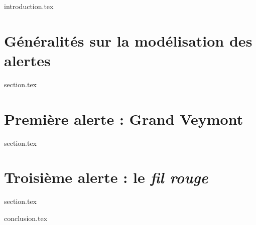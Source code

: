 
\chaptertoc{}

{introduction.tex}

\section{Généralités sur la modélisation des alertes}
\label{sec:9-1}
{section.tex}

\section{Première alerte : Grand Veymont}
\label{sec:9-2}
{section.tex}


\section{Troisième alerte : le \emph{fil rouge}}
\label{sec:9-4}
{section.tex}

{conclusion.tex}

